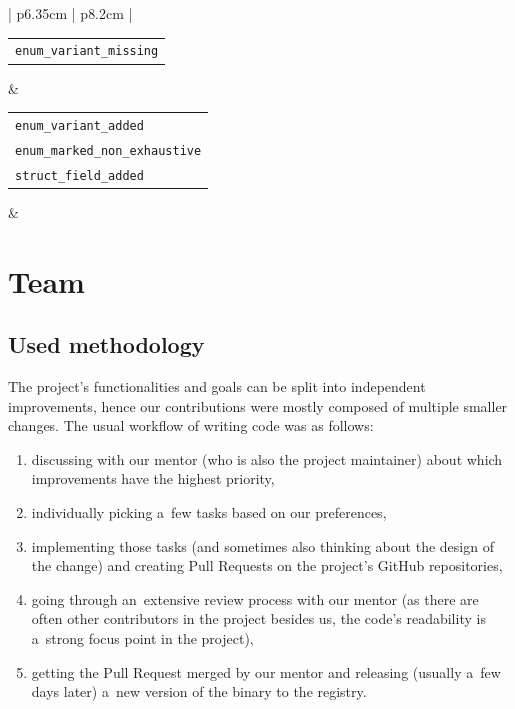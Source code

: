 \documentclass[licencjacka,en]{pracamgr}
\begin{document}
\begin{center}
\begin{longtable}{| p{6.35cm} | p{8.2cm} |}
\begin{tabular}[c]{@{}l@{}}
				\texttt{enum\_variant\_missing}
			\end{tabular} &
			 \\
		\hline
			\begin{tabular}[c]{@{}l@{}}
				\texttt{enum\_variant\_added} \\
				\texttt{enum\_marked\_non\_exhaustive} \\
				\texttt{struct\_field\_added}
			\end{tabular} &
			 \\
		\hline
	\end{longtable}
\end{center}


\chapter{Team}\label{r:chapter_team}

\section{Used methodology}\label{r:section_used_methodology}

The project's functionalities and goals can be split into independent improvements, hence our
contributions were mostly composed of multiple smaller changes. The usual workflow of writing
code was as follows:
\begin{enumerate}
	\item discussing with our mentor (who is also the project maintainer) about which improvements
		have the highest priority,
	\item individually picking a~few tasks based on our preferences,
	\item implementing those tasks (and sometimes also thinking about the design of the change)
		and creating Pull Requests on the project's GitHub repositories,
	\item going through an~extensive review process with our mentor (as there are often other
		contributors in the project besides us, the code's readability is a~strong focus point
		in the project),
	\item getting the Pull Request merged by our mentor and releasing (usually a~few days later)
		a~new version of the binary to the registry.
\end{enumerate}
\end{document}
